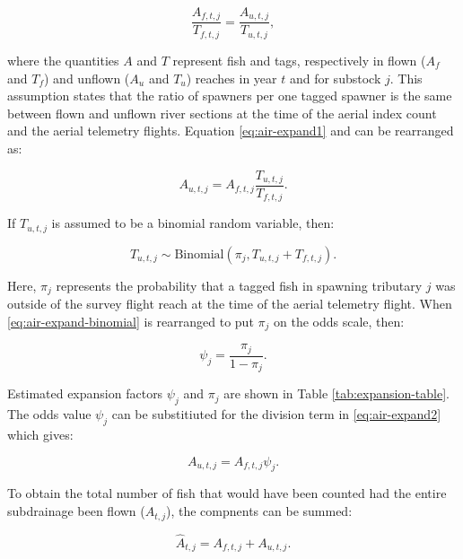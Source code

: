 \documentclass[12pt,]{book}
\theoremstyle{definition}
\theoremstyle{definition}
\theoremstyle{definition}
\theoremstyle{remark}
\begin{document}
\begin{equation}
  \frac{A_{f,t,j}}{T_{f,t,j}} = \frac{A_{u,t,j}}{T_{u,t,j}},
  \label{eq:air-expand1}
\end{equation}

\noindent
where the quantities \(A\) and \(T\) represent fish and tags,
respectively in flown (\(A_f\) and \(T_f\)) and unflown (\(A_u\) and
\(T_u\)) reaches in year \(t\) and for substock \(j\). This assumption
states that the ratio of spawners per one tagged spawner is the same
between flown and unflown river sections at the time of the aerial index
count and the aerial telemetry flights. Equation \eqref{eq:air-expand1}
and can be rearranged as:

\begin{equation}
  A_{u,t,j} = A_{f,t,j} \frac{T_{u,t,j}}{T_{f,t,j}}.
  \label{eq:air-expand2}
\end{equation}

\noindent
If \(T_{u,t,j}\) is assumed to be a binomial random variable, then:

\begin{equation}
  T_{u,t,j} \sim \text{Binomial}(\pi_j,T_{u,t,j} + T_{f,t,j}).
  \label{eq:air-expand-binomial}
\end{equation}

\noindent
Here, \(\pi_j\) represents the probability that a tagged fish in
spawning tributary \(j\) was outside of the survey flight reach at the
time of the aerial telemetry flight. When \eqref{eq:air-expand-binomial}
is rearranged to put \(\pi_j\) on the odds scale, then:

\begin{equation}
  \psi_j=\frac{\pi_j}{1-\pi_j}.
  \label{eq:air-expand-odds}
\end{equation}

\noindent
Estimated expansion factors \(\psi_j\) and \(\pi_j\) are shown in Table
\ref{tab:expansion-table}. The odds value \(\psi_j\) can be substitiuted
for the division term in \eqref{eq:air-expand2} which gives:

\begin{equation}
  A_{u,t,j} = A_{f,t,j} \psi_j.
  \label{eq:air-expand3}
\end{equation}

\noindent
To obtain the total number of fish that would have been counted had the
entire subdrainage been flown (\(\hat{A}_{t,j}\)), the compnents can be
summed:

\begin{equation}
  \hat{A}_{t,j} = A_{f,t,j} + A_{u,t,j}.
  \label{eq:air-expand4}
\end{equation}
\end{document}
